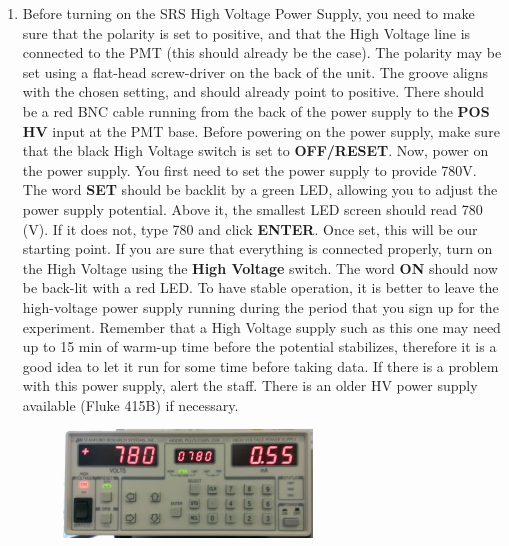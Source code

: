 \documentclass{../lab}
\begin{document}
\begin{enumerate}
    \item Before turning on the SRS High Voltage Power Supply, you need to make sure that the polarity is set to positive, and that the High Voltage line is connected to the PMT (this should already be the case). The polarity may be set using a flat-head screw-driver on the back of the unit. The groove aligns with the chosen setting, and should already point to positive. There should be a red BNC cable running from the back of the power supply to the \textbf{POS HV} input at the PMT base. Before powering on the power supply, make sure that the black High Voltage switch is set to \textbf{OFF/RESET}. Now, power on the power supply. You first need to set the power supply to provide 780V. The word \textbf{SET} should be backlit by a green LED, allowing you to adjust the power supply potential. Above it, the smallest LED screen should read 780 (V). If it does not, type 780 and click \textbf{ENTER}. Once set, this will be our starting point. If you are sure that everything is connected properly, turn on the High Voltage using the \textbf{High Voltage} switch. The word \textbf{ON} should now be back-lit with a red LED. To have stable operation, it is better to leave the high-voltage power supply running during the period that you sign up for the experiment. Remember that a High Voltage supply such as this one may need up to 15 min of warm-up time before the potential stabilizes, therefore it is a good idea to let it run for some time before taking data. If there is a problem with this power supply, alert the staff. There is an older HV power supply available (Fluke 415B) if necessary.
    
    \begin{figure}[h]
        \centering
        \href{http://experimentationlab.berkeley.edu/sites/default/files/images/250px-HV-SRS-PSU.jpg}{\includegraphics[width=0.6\linewidth]{images/250px-HV-SRS-PSU.jpg}}
        \caption{}
        \label{fig:250px-HV-SRS-PSU}
    \end{figure}


\end{enumerate}
\end{document}
